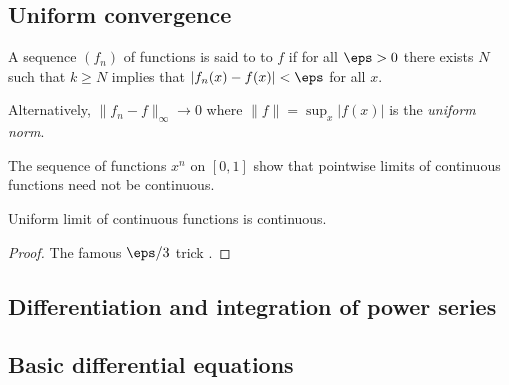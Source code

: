 \subsection{Uniform convergence}

\begin{definition}
A sequence $(f_n)$ of functions is said to  to $f$ if for all $\eps > 0$ there exists $N$ such that $k \geq N$ implies that $|f_n(x) - f(x)| < \eps$ for all $x$.
\end{definition}

Alternatively, $\| f_n - f \|_\infty \to 0$ where $\| f \| = \sup_x |f(x)|$ is the \emph{uniform norm}.

\begin{example}
The sequence of functions $x^n$ on $[0,1]$ show that pointwise limits of continuous functions need not be continuous.
\end{example}

\begin{theorem}
Uniform limit of continuous functions is continuous.
\end{theorem}

\begin{proof}
The famous $\eps/3$ trick \cite{PM351}.
\end{proof}

\subsection{Differentiation and integration of power series}

\subsection{Basic differential equations}